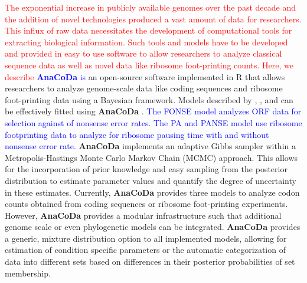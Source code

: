 \documentclass{bioinfo}
\newcommand{\package}{\textbf{AnaCoDa }} %
\begin{document}
\textcolor{red}
{
The exponential increase in publicly available genomes over the past decade and the addition of novel technologies produced a vast amount of data for researchers.  
This influx of raw data necessitates the development of computational tools for extracting biological information. 
Such tools and models have to be developed and provided in easy to use software to allow researchers to analyze classical sequence data as well as novel data like ribosome foot-printing counts.
Here, we describe
} %
\textcolor{blue}{\package is}  an open-source software implemented in R \citep{rcore} that allows researchers to analyze genome-scale data like coding sequences and ribosome foot-printing data using a Bayesian framework. 
Models described by \citet{gilchrist2015}, \citet{wallace2013}, and \citet{shah2011} can be effectively fitted using \package.
\textcolor{blue} 
{
The FONSE model analyzes ORF data for selection against of nonsense error rates.
The PA and PANSE model use ribosome footprinting data to analyze for ribosome pausing time with and without nonsense error rate.
} %
\package implements an adaptive Gibbs sampler within a Metropolis-Hastings Monte Carlo Markov Chain (MCMC) approach. This allows for the incorporation of prior knowledge and easy sampling from the posterior distribution to estimate parameter values and quantify the degree of uncertainty in these estimates.
Currently, \package provides three models to analyze codon counts obtained from coding sequences or ribosome foot-printing experiments. However, \package provides a modular infrastructure such that additional genome scale or even phylogenetic models can be integrated. 
\package provides a generic, mixture distribution option to all implemented models, allowing for estimation of condition specific parameters or the automatic categorization of data into different sets based on differences in their posterior probabilities of set membership.
\end{document}
